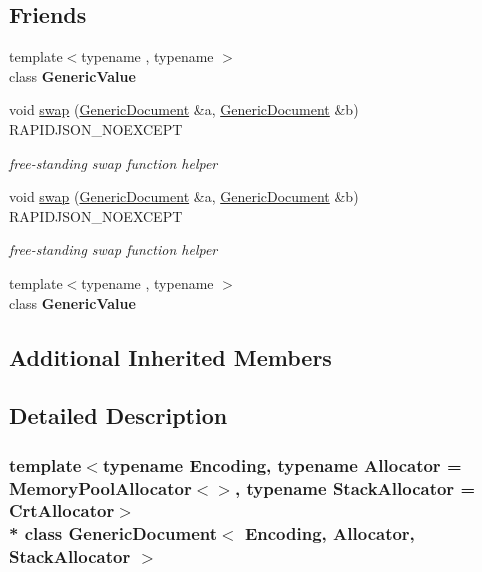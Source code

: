 \subsection*{Friends}
\begin{DoxyCompactItemize}
\item 
{\footnotesize template$<$typename , typename $>$ }\\class {\bfseries Generic\+Value}\hypertarget{class_generic_document_a899449e1a645b5e377af059fb61113d8}{}\label{class_generic_document_a899449e1a645b5e377af059fb61113d8}

\item 
void \hyperlink{class_generic_document_a0d63efcc43758ac3aed77e868233369d}{swap} (\hyperlink{class_generic_document}{Generic\+Document} \&a, \hyperlink{class_generic_document}{Generic\+Document} \&b) R\+A\+P\+I\+D\+J\+S\+O\+N\+\_\+\+N\+O\+E\+X\+C\+E\+PT
\begin{DoxyCompactList}\small\item\em free-\/standing swap function helper \end{DoxyCompactList}\item 
void \hyperlink{class_generic_document_a0d63efcc43758ac3aed77e868233369d}{swap} (\hyperlink{class_generic_document}{Generic\+Document} \&a, \hyperlink{class_generic_document}{Generic\+Document} \&b) R\+A\+P\+I\+D\+J\+S\+O\+N\+\_\+\+N\+O\+E\+X\+C\+E\+PT
\begin{DoxyCompactList}\small\item\em free-\/standing swap function helper \end{DoxyCompactList}\item 
{\footnotesize template$<$typename , typename $>$ }\\class {\bfseries Generic\+Value}\hypertarget{class_generic_document_ae85bda3be5ddb0ad7b3dc29984467ac2}{}\label{class_generic_document_ae85bda3be5ddb0ad7b3dc29984467ac2}

\end{DoxyCompactItemize}
\subsection*{Additional Inherited Members}


\subsection{Detailed Description}
\subsubsection*{template$<$typename Encoding, typename Allocator = Memory\+Pool\+Allocator$<$$>$, typename Stack\+Allocator = Crt\+Allocator$>$\\*
class Generic\+Document$<$ Encoding, Allocator, Stack\+Allocator $>$}


